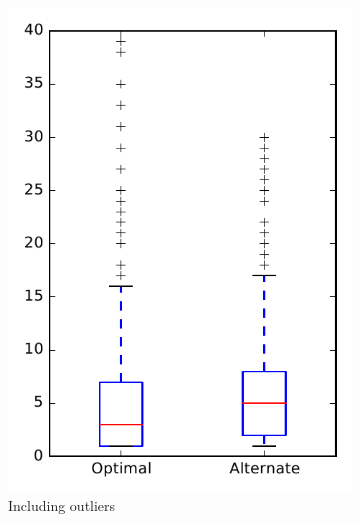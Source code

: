 
\begin{figure}
    \centering
    \begin{subfigure}{.4\textwidth}
        \centering
        \includegraphics[height=0.4\textheight]{figures/combo/dit_rq2_overview}
        \caption{Including outliers}\label{fig:combo:dit:rq2:overview_outlier}
    \end{subfigure}%
    \begin{subfigure}{.4\textwidth}
        \centering

\end{subfigure}
\end{figure}

